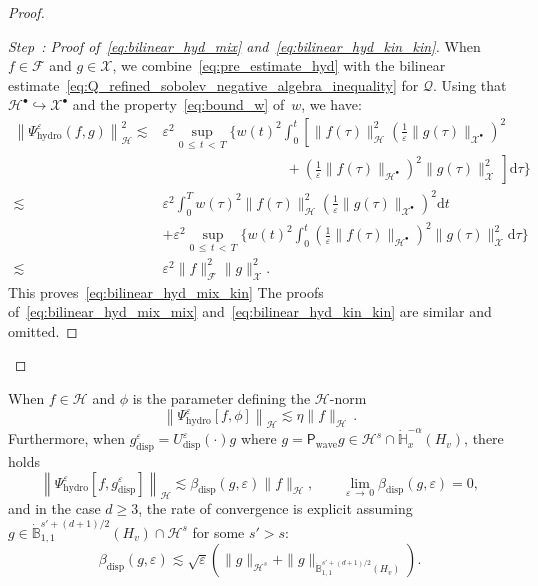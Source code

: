 \documentclass[AHL,Unicode,longabstracts,published]{cedram}
\newcommand{\hyd}{\mathrm{hydro}}
\renewcommand{\d}{\mathrm{d}}
\newcommand{\Wave}{\mathrm{wave}}
\newcommand{\disp}{\mathrm{disp}}
\newcommand{\bbH}{\mathbb{H}}
\newcommand{\bbB}{\mathbb{B}}
\newcommand{\XX}{\mathcal{X}}
\newcommand{\HH}{\mathcal{H}}
\newcommand{\PP}{\mathsf{P}}
\newcommand{\QQ}{\mathcal{Q}}
\newcommand{\FFF}{\mathscr{F}}
\newcommand{\HHH}{\mathscr{H}}
\newcommand{\GGG}{\mathscr{X}}
\newcommand{\Ss}{H}
\newcommand{\SSs}{\HH}
\newcommand{\rSSs}[1]{\HH^{#1}}
\newcommand{\SSsp}{\HH^{\bullet}}
\newcommand{\SSSs}{\HHH}
\newcommand{\SSl}{\XX}
\newcommand{\SSlp}{\XX^{\bullet}}
\newcommand{\SSSl}{\GGG}
\newcommand{\SSSm}{\FFF}
\renewcommand*\le{\leqslant}
\renewcommand*\ge{\geqslant}
\newcommand*\eps{{\varepsilon}}
\newcounter{stepcount}
\newenvironment{step}[1]{\refstepcounter{stepcount}\begin{proof}[Step~\thestepcount: #1]}{\let\qed\relax\end{proof}}
\begin{document}
\begin{proof}
\begin{step}{{Proof of~\eqref{eq:bilinear_hyd_mix} and~\eqref{eq:bilinear_hyd_kin_kin}}}\label{prfprop5.3stp2}
When $f \in \SSSm$ and $g \in \SSSl$, we combine~\eqref{eq:pre_estimate_hyd} with the bilinear estimate~\eqref{eq:Q_refined_sobolev_negative_algebra_inequality} for $\QQ$. Using that $\SSsp \hookrightarrow \SSlp$ and the property~\eqref{eq:bound_w} of~$w$, we have:
\begin{equation*}
\begin{split}
\left\| \Psi^\eps_\hyd (f, g) \right\|_\SSSs^2
\lesssim & \eps^2 \sup_{0\,\le\,t\,<\,T} \Bigg\{w(t)^2 \int_0^t \left[\| f(\tau) \|_{ \SSs }^2 \left(\frac{1}{\eps} \| g(\tau) \|_{\SSlp}\right)^2 \right. \\
& \left.\phantom{+++++++++} + \left(\frac{1}{\eps} \| f(\tau) \|_{\SSsp} \right)^2 \| g(\tau) \|_{ \SSl }^2 \, \right] \d \tau \Bigg\} \\
\lesssim & \eps^2 \int_0^T w(\tau)^2 \|f(\tau) \|_{ \SSs }^2 \left(\frac{1}{\eps} \| g(\tau) \|_{\SSlp}\right)^2 \d t\\
& + \eps^2 \sup_{0\,\le\,t\,<\,T} \Bigg\{w(t)^2 \int_0^t \left(\frac{1}{\eps} \| f(\tau) \|_{\SSsp} \right)^2 \| g(\tau) \|_{ \SSl }^2 \d \tau \Bigg\} \\
\lesssim & \eps^2 \| f \|_\SSSm^2 \| g \|_\SSSl^2.
\end{split}
\end{equation*}
This proves~\eqref{eq:bilinear_hyd_mix_kin} The proofs of~\eqref{eq:bilinear_hyd_mix_mix} and~\eqref{eq:bilinear_hyd_kin_kin} are similar and omitted.\qedhere
\end{step}\let\qed\relax
\end{proof}

\begin{prop}\label{prop:special_bilinear_hydrodynamic}
When $f \in \SSSs$ and $\phi$ is the parameter defining the $\SSSs$-norm
\begin{equation}\label{eq:bilinear_hyd_phi}
\left\| \Psi^\eps_\hyd[f, \phi] \right\|_\SSSs \lesssim \eta \| f \|_\SSSs\,.
\end{equation}
Furthermore, when $g^\eps_\disp = U^\eps_\disp(\cdot) g$ where $g = \PP_{\Wave} g \in \rSSs{s} \cap \dot{\bbH}^{-\alpha}_x (\Ss_v)$, there holds
\begin{equation}\label{eq:bilinear_hyd_disp}
\left\| \Psi^\eps_\hyd\left[f, g^\eps_\disp\right] 
\right\|_\SSSs \lesssim {\beta_{\disp}}(g, \eps) \| f \|_{ \SSSs }, \qquad \lim_{\eps\,\to\,0} {\beta_{\disp}}(g, \eps)=0,
\end{equation}
and in the case $d \ge 3$, the rate of convergence is explicit assuming $g \in \dot{\bbB}^{s' + (d+1)/2}_{1, 1} (\Ss_v) \cap \rSSs{s}$ for some $s'>s$:
\begin{equation*}
{\beta_{\disp}}(g, \eps) \lesssim \sqrt{\eps}
\left(\| g \|_{ \rSSs{s} } + \| g \|_{ \dot{\bbB}^{s' + (d+1)/2 }_{1, 1} \left(\Ss_v \right) }\right).
\end{equation*}
\end{prop}
\end{document}
